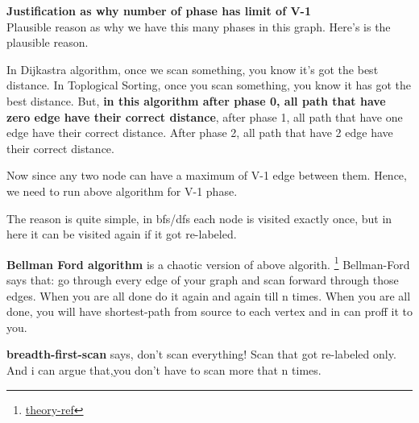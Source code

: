 \textbf{Justification as why number of phase has limit of V-1}\\
Plausible reason as why we have this many phases in this graph. Here's is the plausible reason.

In Dijkastra algorithm, once we scan something, you know it's got the best distance. In Toplogical Sorting, once you scan something, you know it has got the best distance. But, \textbf{in this algorithm after phase 0, all path that have zero edge have their correct distance}, after phase 1, all path that have one edge have their correct distance. After phase 2, all path that have 2 edge have their correct distance.

Now since any two node can have a maximum of V-1 edge between them. Hence, we need to run above algorithm for V-1 phase.

 The reason is quite simple, in bfs/dfs each node is visited exactly once, but in here it can be visited again if it got re-labeled.

\textbf{Bellman Ford algorithm} is a chaotic version of above algorith. \footnote{\href{https://youtu.be/XIAQRlNkJAw?t=2335}{theory-ref}} 
Bellman-Ford says that: go through every edge of your graph and scan forward through those edges. When you are all done do it again and again till n times. When you are all done, you will have shortest-path from source to each vertex and in can proff it to you.

\textbf{breadth-first-scan} says, don't scan everything! Scan that got re-labeled only. And i can argue that,you don't have to scan more that n times.


